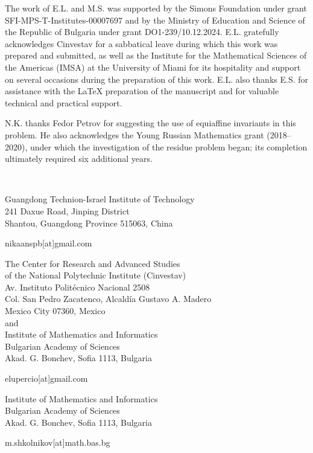 \documentclass[a4paper,american,11pt]{amsart}
\theoremstyle{plain}
\theoremstyle{definition}
\begin{document}
The work of E.L. and M.S. was supported by the Simons Foundation under grant SFI-MPS-T-Institutes-00007697 and by the Ministry of Education and Science of the Republic of Bulgaria under grant DO1-239/10.12.2024. E.L. gratefully acknowledges Cinvestav for a sabbatical leave during which this work was prepared and submitted, as well as the Institute for the Mathematical Sciences of the Americas (IMSA) at the University of Miami for its hospitality and support on several occasions during the preparation of this work. E.L. also thanks E.S. for assistance with the \LaTeX{} preparation of the manuscript and for valuable technical and practical support.


N.K. thanks Fedor Petrov for suggesting the use of equiaffine invariants in this problem. He also acknowledges the Young Russian Mathematics grant (2018--2020), under which the investigation of the residue problem began; its completion ultimately required six additional years.

\printbibliography %


\newpage
\thispagestyle{empty}
{\centering
\ 
\vspace{77pt}

Guangdong Technion-Israel Institute of Technology\\
241 Daxue Road, Jinping District\\ 
Shantou, Guangdong Province 515063, China\\
\vspace{5pt}

nikaanspb[at]gmail.com\vspace{81pt}

The Center for Research and Advanced Studies\\ of the National Polytechnic Institute (Cinvestav)\\
Av. Instituto Politécnico Nacional 2508\\
Col. San Pedro Zacatenco, Alcaldía Gustavo A. Madero\\
Mexico City 07360, Mexico\\\vspace{4pt}
and\\\vspace{4pt}
Institute of Mathematics and Informatics\\
Bulgarian Academy of Sciences\\
Akad. G. Bonchev, Sofia 1113, Bulgaria \\\vspace{5pt} 

elupercio[at]gmail.com\\\vspace{81pt}

Institute of Mathematics and Informatics\\
Bulgarian Academy of Sciences\\
Akad. G. Bonchev, Sofia 1113, Bulgaria \\\vspace{5pt}

m.shkolnikov[at]math.bas.bg\\ 


}
\end{document}
